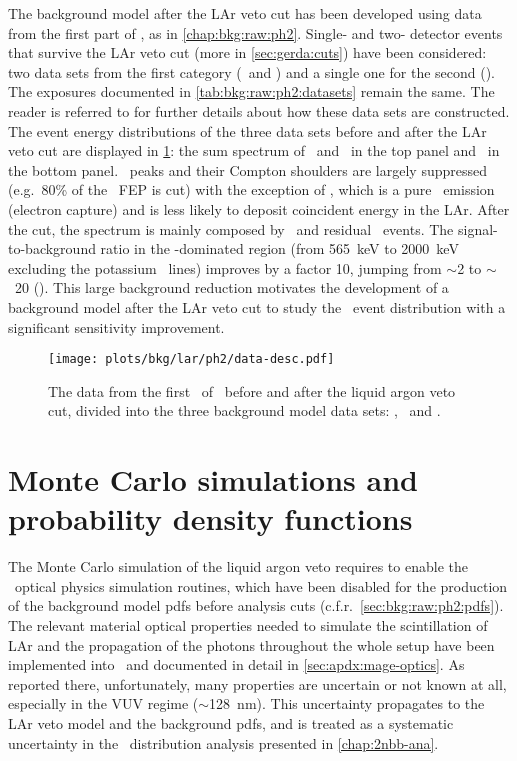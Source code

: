 The background model after the LAr veto cut has been developed using data from the first
part of \gerdatwo, as in \cref{chap:bkg:raw:ph2}. Single- and two- detector events that
survive the LAr veto cut (more in \cref{sec:gerda:cuts}) have been considered: two data
sets from the first category (\enrBEGeII\ and \enrCoaxII) and a single one for the second
(\enrGeII). The exposures documented in \cref{tab:bkg:raw:ph2:datasets} remain the same.
The reader is referred to \label{sec:bkg:raw:ph2:data} for further details about how these
data sets are constructed.
\newpar
The event energy distributions of the three data sets before and after the LAr veto cut
are displayed in \cref{fig:bkg:lar:ph2:data-desc}: the sum spectrum of \enrBEGeII\ and
\enrCoaxII\ in the top panel and \enrGeII\ in the bottom panel. \g\ peaks and their
Compton shoulders are largely suppressed (e.g.~80\% of the \kvz\ FEP is cut) with the
exception of \kvn, which is a pure \g\ emission (electron capture) and is less likely to
deposit coincident energy in the LAr. After the cut, the spectrum is mainly composed by
\nnbb\ and residual \a\ events. The signal-to-background ratio in the \nnbb-dominated
region (from 565~keV to 2000~keV excluding the potassium \g\ lines) improves by a factor
10, jumping from $\sim$2 to $\sim$~20 (). This large
background reduction motivates the development of a background model after the LAr veto
cut to study the \nnbb\ event distribution with a significant sensitivity improvement.

\begin{figure}
  \centering
  \texttt{[image: plots/bkg/lar/ph2/data-desc.pdf]}
  \caption{%
    The data from the first \gexpophasetwobkg\ of \gerdatwo\ before and after the liquid argon veto
    cut, divided into the three background model data sets: \enrBEGeII, \enrCoaxII\ and
    \enrGeII.
  }\label{fig:bkg:lar:ph2:data-desc}
\end{figure}

\section{Monte Carlo simulations and probability density functions}%
\label{sec:bkg:lar:ph2:pdfs}

The Monte Carlo simulation of the liquid argon veto requires to enable the \geant\ optical physics
simulation routines, which have been disabled for the production of the background model
pdfs before analysis cuts (c.f.r.~\cref{sec:bkg:raw:ph2:pdfs}). The relevant material
optical properties needed to simulate the scintillation of LAr and the propagation of the
photons throughout the whole setup have been implemented into \mage\ and documented in
detail in \cref{sec:apdx:mage-optics}. As reported there, unfortunately, many properties
are uncertain or not known at all, especially in the VUV regime ($\sim$128~nm). This
uncertainty propagates to the LAr veto model and the background pdfs, and is treated as a
systematic uncertainty in the \nnbb\ distribution analysis presented in
\cref{chap:2nbb-ana}.

